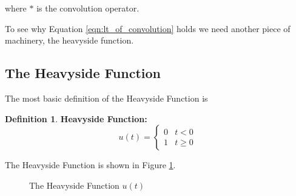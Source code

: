 \documentclass{article}
\theoremstyle{definition}
\newtheorem{definition}{Definition}[section]
\begin{document}
\bigskip
\noindent
where $\ast$ is the convolution operator.

\bigskip
\noindent
To see why Equation  \ref{eqn:lt_of_convolution} holds we need another piece of machinery, the heavyside function.

\subsection{The Heavyside Function}
The most basic definition of the Heavyside Function is


\begin{definition} {\bf Heavyside Function:}
\bigskip
\begin{equation*}
u(t) =
 \begin{cases} 
   0 & t < 0  \\
    1 & t \geq 0
   \end{cases}
\end{equation*}
\label{def:heavyside_function}
\end{definition}

\bigskip
\noindent
The Heavyside Function is shown in Figure \ref{fig:u(t)}.


\bigskip
\begin{figure}[H]
  \centering
  \caption{The Heavyside Function $u(t)$}
  \label{fig:u(t)}
\end{figure}
\end{document}

